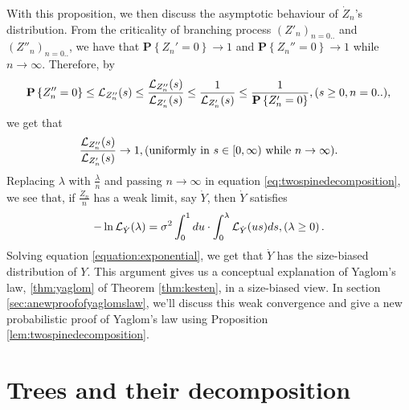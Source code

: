 \documentclass[12pt]{amsart}
\theoremstyle{remark}
\numberwithin{equation}{section}
\newcommand{\prob}{\mathbf P}
\newcommand{\expr}[1]{\left( #1 \right)}
\newcommand{\set}[1]{\left\{ #1 \right\}}
\newcommand{\uniformly}{\text{uniformly in }}
\newcommand{\while}{\text{ while }}
\begin{document}
\par
	With this proposition, we then discuss the asymptotic behaviour of $\dot Z_n$'s distribution. From the criticality of branching process $(Z'_n)_{n=0..}$ and $(Z''_n)_{n=0..}$, we have that $\prob\set{Z_n'=0}\to 1$ and $\prob\set{Z_n''=0}\to 1$ while $n\to\infty$. Therefore, by
\begin{equation*}
		\prob\set{Z_n''=0}
	\leq
		\cL_{Z_n''}(s)
	\leq
		\frac{\cL_{Z_n''}(s)}{\cL_{Z_n'}(s)}
	\leq 
		\frac{1}{\cL_{Z_n'}(s)}
	\leq 
		\frac{1}{\prob \set{Z_n'=0}}
	,(s\geq 0,n=0..),
\end{equation*}
    we get that
\begin{equation}
\label{eq:uniformly}
	    \frac{\cL_{Z_n''}(s)}{\cL_{Z_n'}(s)}
	\to 
	    1
	,(\uniformly s\in [0,\infty)\while n\to\infty).
\end{equation}
    Replacing $\lambda$ with $\frac{\lambda}{n}$ and passing $n\to\infty$ in equation \eqref{eq:twospinedecomposition}, we see that, if $\frac{\dot Z_n}{n}$ has a weak limit, say $\dot Y$, then $\dot Y$ satisfies
\begin{equation}
\label{equation:exponential}
		-\ln \cL_{\dot Y}(\lambda)
	=
		\sigma^2\int_0^1du\cdot\int_0^\lambda \cL_{\dot Y}(us)ds 
	,\expr{\lambda \geq 0}.
\end{equation}
	Solving equation \eqref{equation:exponential}, we get that $\dot Y$ has the size-biased distribution of $Y$. This argument gives us a conceptual explanation of Yaglom's law, \eqref{thm:yaglom} of Theorem \ref{thm:kesten}, in a size-biased view. In section \ref{sec:anewproofofyaglomslaw}, we'll discuss this weak convergence and give a new probabilistic proof of Yaglom's law using Proposition \ref{lem:twospinedecomposition}. 
\section{Trees and their decomposition}
\label{sec:preliminary}
\end{document}
